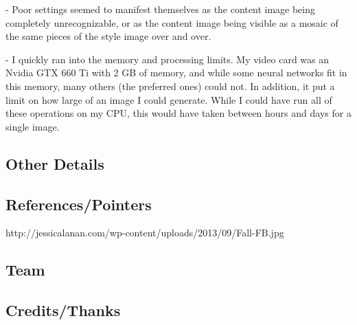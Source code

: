 \documentclass{article}
\begin{document}
- Poor settings seemed to manifest themselves as the content image
being completely unrecognizable, or as the content image being visible
as a mosaic of the same pieces of the style image over and over.

- I quickly ran into the memory and processing limits.  My video card
was an Nvidia GTX 660 Ti with 2 GB of memory, and while some neural
networks fit in this memory, many others (the preferred ones) could
not.  In addition, it put a limit on how large of an image I could
generate.  While I could have run all of these operations on my CPU,
this would have taken between hours and days for a single image.

\subsection{Other Details}

\subsection{References/Pointers}

http://jessicalanan.com/wp-content/uploads/2013/09/Fall-FB.jpg

\subsection{Team}

\subsection{Credits/Thanks}


\end{document}
